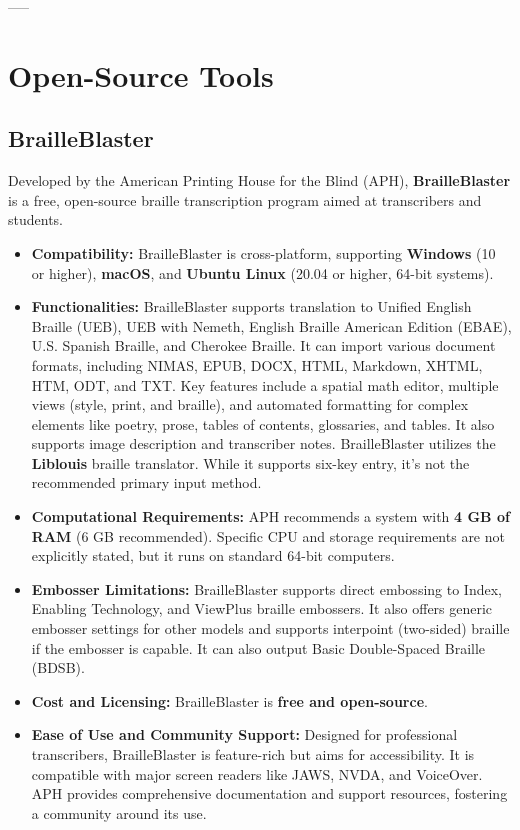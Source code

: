 -----

\section{Open-Source Tools}

\subsection{BrailleBlaster}
Developed by the American Printing House for the Blind (APH), \textbf{BrailleBlaster} is a free, open-source braille transcription program aimed at transcribers and students.

\vspace{1em}
\begin{itemize}
\item \textbf{Compatibility:} BrailleBlaster is cross-platform, supporting \textbf{Windows} (10 or higher), \textbf{macOS}, and \textbf{Ubuntu Linux} (20.04 or higher, 64-bit systems)\footnotemark[7].
\item \textbf{Functionalities:} BrailleBlaster supports translation to Unified English Braille (UEB), UEB with Nemeth, English Braille American Edition (EBAE), U.S. Spanish Braille, and Cherokee Braille. It can import various document formats, including NIMAS, EPUB, DOCX, HTML, Markdown, XHTML, HTM, ODT, and TXT. Key features include a spatial math editor, multiple views (style, print, and braille), and automated formatting for complex elements like poetry, prose, tables of contents, glossaries, and tables. It also supports image description and transcriber notes. BrailleBlaster utilizes the \textbf{Liblouis} braille translator\footnotemark[7]. While it supports six-key entry, it's not the recommended primary input method.
\item \textbf{Computational Requirements:} APH recommends a system with \textbf{4 GB of RAM} (6 GB recommended). Specific CPU and storage requirements are not explicitly stated, but it runs on standard 64-bit computers.
\item \textbf{Embosser Limitations:} BrailleBlaster supports direct embossing to Index, Enabling Technology, and ViewPlus braille embossers. It also offers generic embosser settings for other models and supports interpoint (two-sided) braille if the embosser is capable\footnotemark[8]. It can also output Basic Double-Spaced Braille (BDSB).
\item \textbf{Cost and Licensing:} BrailleBlaster is \textbf{free and open-source}\footnotemark[7].
\item \textbf{Ease of Use and Community Support:} Designed for professional transcribers, BrailleBlaster is feature-rich but aims for accessibility. It is compatible with major screen readers like JAWS, NVDA, and VoiceOver. APH provides comprehensive documentation and support resources, fostering a community around its use\footnotemark[7].
\end{itemize}
\vspace{1em}

